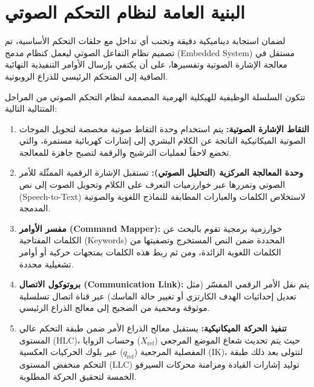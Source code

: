 \section{البنية العامة لنظام التحكم الصوتي}
لضمان استجابة ديناميكية دقيقة وتجنب أي تداخل مع حلقات التحكم الأساسية، تم تصميم نظام التفاعل الصوتي ليعمل كنظام مدمج (\textenglish{Embedded System}) مستقل في معالجة الإشارة الصوتية وتفسيرها، على أن يكتفي بإرسال الأوامر التنفيذية النهائية الصافية إلى المتحكم الرئيسي للذراع الروبوتية.

تتكون السلسلة الوظيفية للهيكلية الهرمية المصممة لنظام التحكم الصوتي من المراحل المتتالية التالية:
\begin{enumerate}
    \item \textbf{التقاط الإشارة الصوتية:} يتم استخدام وحدة التقاط صوتية مخصصة لتحويل الموجات الصوتية الميكانيكية الناتجة عن الكلام البشري إلى إشارات كهربائية مستمرة، والتي تخضع لاحقاً لعمليات الترشيح والرقمة لتصبح جاهزة للمعالجة.
    \item \textbf{وحدة المعالجة المركزية (التحليل الصوتي):} تستقبل الإشارة الرقمية الممثّلة للأمر الصوتي وتمررها عبر خوارزميات التعرف على الكلام وتحويل الصوت إلى نص (\textenglish{Speech-to-Text}) لاستخلاص الكلمات والعبارات المطابقة للنماذج اللغوية والصوتية المدمجة.
    \item \textbf{مفسر الأوامر (\textenglish{Command Mapper}):} خوارزمية برمجية تقوم بالبحث عن الكلمات المفتاحية (\textenglish{Keywords}) المحددة ضمن النص المستخرج وتصفيتها من الكلمات اللغوية الزائدة، ومن ثم ربط هذه الكلمات بمتجهات حركية أو أوامر تشغيلية محددة.
    \item \textbf{بروتوكول الاتصال (\textenglish{Communication Link}):} يتم نقل الأمر الرقمي المفسّر (مثل تعديل إحداثيات الهدف الكارتزي أو تغيير حالة الماسك) عبر قناة اتصال تسلسلية موثوقة ومحمية من الضجيج إلى معالج الذراع الرئيسي.
    \item \textbf{تنفيذ الحركة الميكانيكية:} يستقبل معالج الذراع الأمر ضمن طبقة التحكم عالي المستوى (\textenglish{HLC})، حيث يتم تحديث شعاع الموضع المرجعي ($X_{\text{ref}}$) وحساب الزوايا المفصلية المرجعية ($q_{\text{ref}}$) عبر بلوك الحركيات العكسية (\textenglish{IK})، لتتولى بعد ذلك طبقة التحكم منخفض المستوى (\textenglish{LLC}) توليد إشارات القيادة ومزامنة محركات السيرفو الخمسة لتحقيق الحركة المطلوبة.
\end{enumerate}